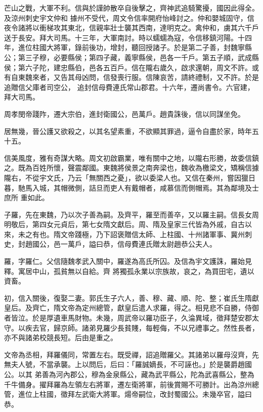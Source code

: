 \begin{pinyinscope}
 芒山之戰，大軍不利。信與於謹帥散卒自後擊之，齊神武追騎驚擾，國因此得全。及涼州刺史宇文仲和
 據州不受代，周文令信率開府怡峰討之。仲和嬰城固守，信夜令諸將以衝梯攻其東北，信親率壯士襲其西南，達明克之。禽仲和，虜其六千戶送于長安。拜大司馬。十三年，大軍南討。時以蠕蠕為寇，令信移鎮河陽。十四年，進位柱國大將軍，錄前後功，增封，聽回授諸子。於是第二子善，封魏寧縣公；第三子穆，必要縣侯；第四子藏，義寧縣侯，邑各一千戶。第五子順，武成縣侯；第六子陀，建忠縣伯，邑各五百戶。信在隴右歲久，啟求還朝，周文不許。或有自東魏來者，又告其母凶問，信發喪行服。信陳哀苦，請終禮制，又不許。於是追贈信父庫者司空公，
 追封信母費連氏常山郡君。十六年，遷尚書令。六官建，拜大司馬。



 周孝閔帝踐阼，遷大宗伯，進封衛國公，邑萬戶。趙貴誅後，信以同謀坐免。



 居無幾，晉公護又欲殺之，以其名望素重，不欲顯其罪過，逼令自盡於家，時年五十五。



 信美風度，雅有奇謀大略。周文初啟霸業，唯有關中之地，以隴右形勝，故委信鎮之。既為百姓所懷，聲震鄰國。東魏將侯景之南奔梁也，魏收為檄梁文，矯稱信據隴右，不從宇文氏，乃云「無關西之憂」，欲以委梁人也。又信在秦州，嘗因獵日暮，馳馬入城，其帽微側，詰旦而吏人有戴帽者，咸慕信而側帽焉。其為鄰境及士庶所
 重如此。



 子羅，先在東魏，乃以次子善為嗣。及齊平，羅至而善卒，又以羅主嗣。信長女周明敬后，第四女元貞后，第七女隋文獻后。周、隋及皇家三代皆為外戚，自古以來，未之有也。隋文帝踐極，乃下詔褒贈信太師、上柱國、十州諸軍事、冀州刺史，封趙國公，邑一萬戶，謚曰恭，信母費連氏贈太尉趙恭公夫人。



 羅，字羅仁。父信隨魏孝武入關中，羅遂為高氏所囚。及信為宇文護誅，羅始見釋。寓居中山，孤貧無以自給。齊
 將獨孤永業以宗族故，哀之，為買田宅，遺以資畜。



 初，信入關後，復娶二妻。郭氏生子六人，善、穆、藏、順、陀、整；崔氏生隋獻皇后。及齊亡，隋文帝為定州總管，獻皇后遣人求羅，得之。相見悲不自勝，侍御者皆泣。於是厚遺車馬財物。未幾，周武帝以羅功臣子，久淪異域，徵拜楚安郡太守。以疾去官，歸京師。諸弟見羅少長貧賤，每輕侮，不以兄禮事之。然性長者，亦不與諸弟校競長短。后由是重之。



 文帝為丞相，拜羅儀同，常置左右。既受禪，詔追贈羅父。其諸弟以羅母沒齊，先無夫人號，不當承襲。上以問后，后曰：「羅誠嫡長，不可誣也。」於是襲爵趙國公。以其
 弟善為河內郡公，穆為金泉縣公，藏為武平縣公，陀為武喜縣公，整為千牛備身。擢拜羅為左領左右將軍，遷左衛將軍，前後賞賜不可勝計。出為涼州總管，進位上柱國，徵拜左武衛大將軍。煬帝嗣位，改封蜀國公。未幾卒官，謚曰恭。




\end{pinyinscope}

